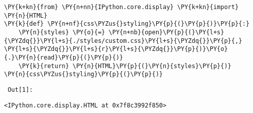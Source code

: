 
{\par%
\vspace{-1\baselineskip}%
}%
\begin{notebookcell}[1]%
\begin{addmargin}[\cellleftmargin]{0em}%
{\smaller%
\par%
%
\vspace{-1\smallerfontscale}%
\begin{Verbatim}[commandchars=\\\{\}]
\PY{k+kn}{from} \PY{n+nn}{IPython.core.display} \PY{k+kn}{import} \PY{n}{HTML}
\PY{k}{def} \PY{n+nf}{css\PYZus{}styling}\PY{p}{(}\PY{p}{)}\PY{p}{:}
    \PY{n}{styles} \PY{o}{=} \PY{n+nb}{open}\PY{p}{(}\PY{l+s}{\PYZdq{}}\PY{l+s}{./styles/custom.css}\PY{l+s}{\PYZdq{}}\PY{p}{,} \PY{l+s}{\PYZdq{}}\PY{l+s}{r}\PY{l+s}{\PYZdq{}}\PY{p}{)}\PY{o}{.}\PY{n}{read}\PY{p}{(}\PY{p}{)}
    \PY{k}{return} \PY{n}{HTML}\PY{p}{(}\PY{n}{styles}\PY{p}{)}
\PY{n}{css\PYZus{}styling}\PY{p}{(}\PY{p}{)}
\end{Verbatim}
%
\par%
\vspace{-1\smallerfontscale}}%
\end{addmargin}
\end{notebookcell}

\par\vspace{1\smallerfontscale}%
    
        {\par%
        \vspace{-1\smallerfontscale}%
        \noindent%
        \begin{minipage}{\cellleftmargin}%
    \hfill%
    {\smaller%
    \tt%
    \color{nbframe-out-prompt}%
    Out[1]:}%
    \hspace{\inputpadding}%
    \hspace{0em}%
    \hspace{3pt}%
    \end{minipage}%
        }%
    \begin{addmargin}[\cellleftmargin]{0em}%
    {\smaller%
    \vspace{-1\smallerfontscale}%
    
    
    
    \begin{verbatim}
<IPython.core.display.HTML at 0x7f8c3992f850>
    \end{verbatim}

    
}%
    \end{addmargin}%

